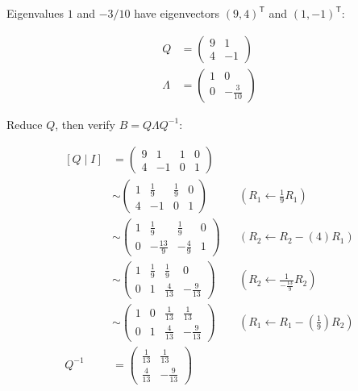 \documentclass[11pt]{article}
\begin{document}
Eigenvalues \(1\) and \(-3/10\) have eigenvectors \((9,4)^{\mathsf T}\) and \((1,-1)^{\mathsf T}\):

\begin{align*}Q &= \begin{pmatrix}9 & 1 \\ 4 & -1\end{pmatrix} \\
\Lambda &= \begin{pmatrix}1 & 0 \\ 0 & -\frac{3}{10}\end{pmatrix}\end{align*}

Reduce \(Q\), then verify \(B=Q\Lambda Q^{-1}\):

\[\begin{aligned}\left[Q\mid I\right] &= \begin{pmatrix}9 & 1 & 1 & 0 \\ 4 & -1 & 0 & 1\end{pmatrix} \\
&\sim \begin{pmatrix}1 & \frac{1}{9} & \frac{1}{9} & 0 \\ 4 & -1 & 0 & 1\end{pmatrix} && \left(R_{1}\leftarrow \frac{1}{9}R_{1}\right) \\
&\sim \begin{pmatrix}1 & \frac{1}{9} & \frac{1}{9} & 0 \\ 0 & -\frac{13}{9} & -\frac{4}{9} & 1\end{pmatrix} && \left(R_{2}\leftarrow R_{2}-\left(4\right)R_{1}\right) \\
&\sim \begin{pmatrix}1 & \frac{1}{9} & \frac{1}{9} & 0 \\ 0 & 1 & \frac{4}{13} & -\frac{9}{13}\end{pmatrix} && \left(R_{2}\leftarrow \frac{1}{-\frac{13}{9}}R_{2}\right) \\
&\sim \begin{pmatrix}1 & 0 & \frac{1}{13} & \frac{1}{13} \\ 0 & 1 & \frac{4}{13} & -\frac{9}{13}\end{pmatrix} && \left(R_{1}\leftarrow R_{1}-\left(\frac{1}{9}\right)R_{2}\right) \\
Q^{-1} &= \begin{pmatrix}\frac{1}{13} & \frac{1}{13} \\ \frac{4}{13} & -\frac{9}{13}\end{pmatrix}\end{aligned}\]
\end{document}
